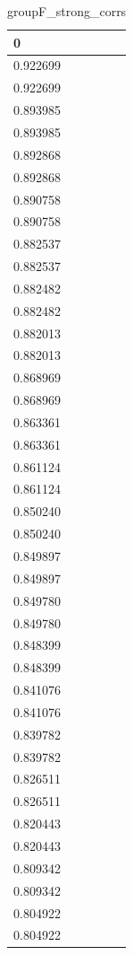 \begin{table}
\caption{groupF_strong_corrs}
\label{tab:groupF_strong_corrs}
\begin{tabular}{lcr}
\toprule
0 \\
\midrule
0.922699 \\
0.922699 \\
0.893985 \\
0.893985 \\
0.892868 \\
0.892868 \\
0.890758 \\
0.890758 \\
0.882537 \\
0.882537 \\
0.882482 \\
0.882482 \\
0.882013 \\
0.882013 \\
0.868969 \\
0.868969 \\
0.863361 \\
0.863361 \\
0.861124 \\
0.861124 \\
0.850240 \\
0.850240 \\
0.849897 \\
0.849897 \\
0.849780 \\
0.849780 \\
0.848399 \\
0.848399 \\
0.841076 \\
0.841076 \\
0.839782 \\
0.839782 \\
0.826511 \\
0.826511 \\
0.820443 \\
0.820443 \\
0.809342 \\
0.809342 \\
0.804922 \\
0.804922 \\
\bottomrule
\end{tabular}
\end{table}
